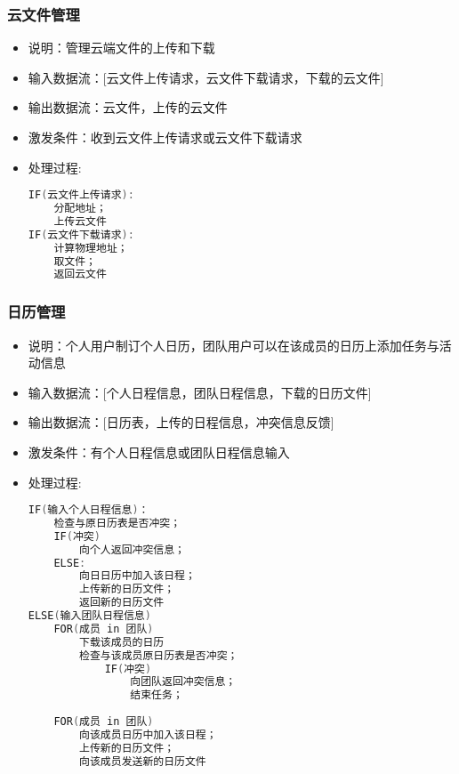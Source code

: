             \subsubsection{云文件管理}
            \begin{itemize}
                \item 说明：管理云端文件的上传和下载
                \item 输入数据流：[云文件上传请求，云文件下载请求，下载的云文件]
                \item 输出数据流：云文件，上传的云文件
                \item 激发条件：收到云文件上传请求或云文件下载请求
                \item 处理过程: 
\begin{lstlisting}[language=C, caption=云文件管理, label={code:first-code}]
IF(云文件上传请求):
    分配地址；
    上传云文件
IF(云文件下载请求):
    计算物理地址；
    取文件；
    返回云文件
\end{lstlisting}
            \end{itemize}
            \subsubsection{日历管理}
            \begin{itemize}
                \item 说明：个人用户制订个人日历，团队用户可以在该成员的日历上添加任务与活动信息
                \item 输入数据流：[个人日程信息，团队日程信息，下载的日历文件]
                \item 输出数据流：[日历表，上传的日程信息，冲突信息反馈]
                \item 激发条件：有个人日程信息或团队日程信息输入
                \item 处理过程:
\begin{lstlisting}[language=C, caption=日历管理, label={code:first-code}]
IF(输入个人日程信息)：
    检查与原日历表是否冲突；
    IF(冲突) 
        向个人返回冲突信息；
    ELSE:
        向日日历中加入该日程；
        上传新的日历文件；
        返回新的日历文件
ELSE(输入团队日程信息)
    FOR(成员 in 团队)
        下载该成员的日历
        检查与该成员原日历表是否冲突；
            IF(冲突) 
                向团队返回冲突信息；
                结束任务；
                    
    FOR(成员 in 团队)
        向该成员日历中加入该日程；
        上传新的日历文件；
        向该成员发送新的日历文件
\end{lstlisting}
            \end{itemize}
